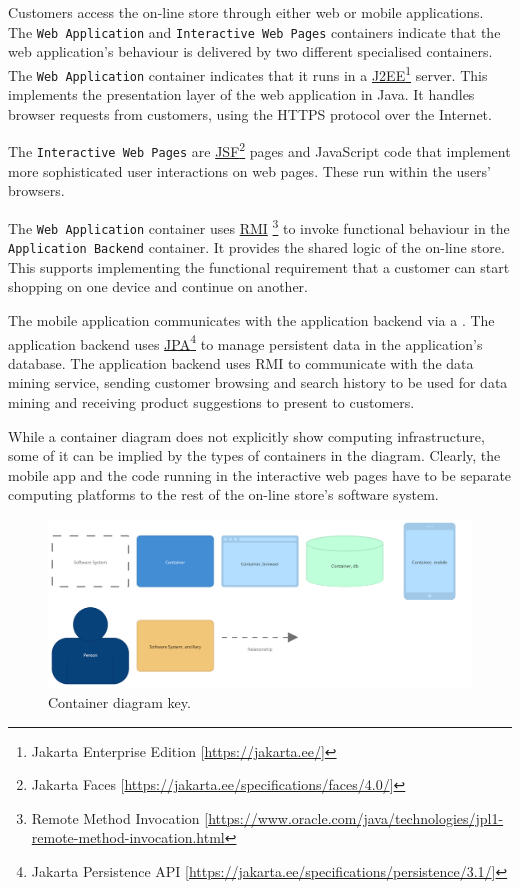 Customers access the on-line store through either web or mobile applications.
The \texttt{Web Application} and \texttt{Interactive Web Pages} containers indicate
that the web application's behaviour is delivered by two different specialised containers.
The \texttt{Web Application} container indicates that it runs in a 
\href{https://jakarta.ee/}{J2EE}\footnote{Jakarta Enterprise Edition [\url{https://jakarta.ee/}]} server.
This implements the presentation layer of the web application in Java.
It handles browser requests from customers, using the HTTPS protocol over the Internet.

The \texttt{Interactive Web Pages} are
\href{https://jakarta.ee/specifications/faces/4.0/}{JSF}\footnote{Jakarta Faces [\url{https://jakarta.ee/specifications/faces/4.0/}]}
pages and JavaScript code that implement more sophisticated user interactions on web pages.
These run within the users' browsers.

The \texttt{Web Application} container uses
\href{https://www.oracle.com/java/technologies/jpl1-remote-method-invocation.html}{RMI}%
\footnote{Remote Method Invocation [\url{https://www.oracle.com/java/technologies/jpl1-remote-method-invocation.html}} 
to invoke functional behaviour in the \texttt{Application Backend} container.
It provides the shared logic of the on-line store.
This supports implementing the functional requirement that a customer can start shopping on one device and continue on another.

The mobile application communicates with the application backend via a
.
The application backend uses \href{https://jakarta.ee/specifications/persistence/3.1/}
{JPA}\footnote{Jakarta Persistence API [\url{https://jakarta.ee/specifications/persistence/3.1/}]}
to manage persistent data in the application's database.
The application backend uses RMI to communicate with the data mining service,
sending customer browsing and search history to be used for data mining
and receiving product suggestions to present to customers.

While a container diagram does not explicitly show computing infrastructure,
some of it can be implied by the types of containers in the diagram.
Clearly, the mobile app and the code running in the interactive web pages
have to be separate computing platforms to the rest of the on-line store's software system.

\begin{figure}[h!]
    \centering
    \includegraphics[trim=22 21 98 26,clip,width=\textwidth]{images/c4/container_diagram-key.png}
    \caption{Container diagram key.}
    \label{fig:c4_container_key}
\end{figure}

